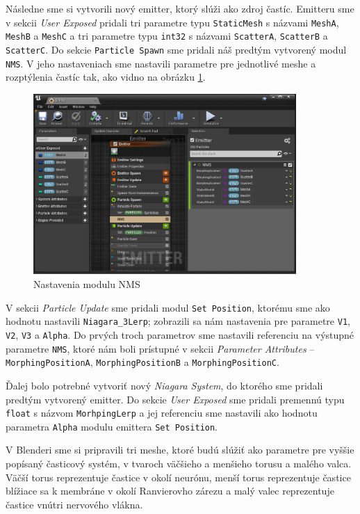 Následne sme si vytvorili nový emitter, ktorý slúži ako zdroj častíc. Emitteru sme v sekcii \emph{User Exposed} pridali tri parametre typu \texttt{StaticMesh} s názvami \texttt{MeshA}, \texttt{MeshB} a \texttt{MeshC}
a tri parametre typu \texttt{int32} s názvami \texttt{ScatterA}, \texttt{ScatterB} a \texttt{ScatterC}. 
\newpage Do sekcie \texttt{Particle Spawn} sme pridali náš predtým vytvorený modul \texttt{NMS}. V jeho nastaveniach sme 
nastavili parametre pre jednotlivé meshe a rozptýlenia častíc tak, ako vidno na obrázku \ref{nms-settings}. 

\begin{figure}[!htbp]
  \centering
  \includegraphics[width=10cm]{img/nms-settings.png}
  \caption{Nastavenia modulu NMS}
  \label{nms-settings}
\end{figure}	

V sekcii \emph{Particle Update} sme pridali modul \texttt{Set Position}, ktorému sme ako hodnotu nastavili 
\texttt{Niagara\_3Lerp}; zobrazili sa nám nastavenia pre parametre \texttt{V1}, \texttt{V2}, \texttt{V3} a \texttt{Alpha}. Do prvých troch parametrov sme nastavili referenciu na výstupné parametre \texttt{NMS}, ktoré
nám boli prístupné v sekcii \emph{Parameter Attributes} {--} \texttt{MorphingPositionA}, \texttt{MorphingPositionB} a \texttt{MorphingPositionC}. 

Ďalej bolo potrebné vytvoriť nový \emph{Niagara System}, do ktorého sme pridali predtým vytvorený emitter. Do sekcie \emph{User Exposed} sme pridali premennú typu \texttt{float} s názvom \texttt{MorhpingLerp} a jej 
referenciu sme nastavili ako hodnotu parametra \texttt{Alpha} modulu emittera \texttt{Set Position}.

V Blenderi sme si pripravili tri meshe, ktoré budú slúžiť ako parametre pre vyššie popísaný časticový systém, v tvaroch väčšieho a menšieho torusu a malého valca. Väčší torus reprezentuje častice v okolí neurónu, 
menší torus reprezentuje častice blížiace sa k membráne v okolí Ranvierovho zárezu a malý valec reprezentuje častice vnútri nervového vlákna.

